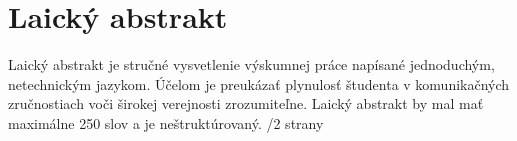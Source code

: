 \chapter{Laický abstrakt}

\par{
Laický abstrakt je stručné vysvetlenie výskumnej práce napísané jednoduchým, netechnickým jazykom. Účelom je preukázať plynulosť študenta v komunikačných zručnostiach voči širokej verejnosti zrozumiteľne. Laický abstrakt by mal mať maximálne 250 slov a je neštruktúrovaný. /2 strany
}